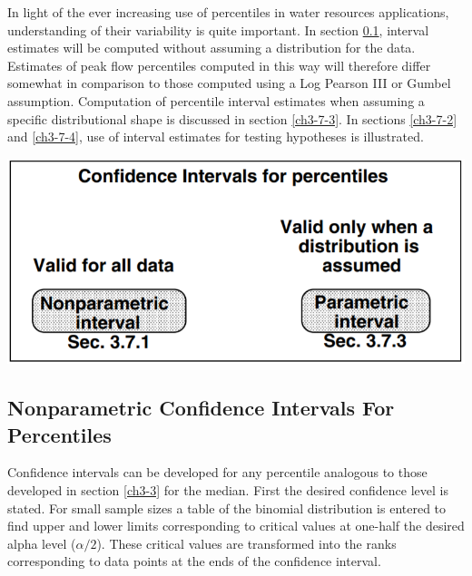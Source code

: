 \documentclass[]{book}
\begin{document}
In light of the ever increasing use of percentiles in water resources applications, understanding of their variability is quite important. In section \ref{ch3-7-1}, interval estimates will be computed without assuming a distribution for the data. Estimates of peak flow percentiles computed in this way will therefore differ somewhat in comparison to those computed using a Log Pearson III or Gumbel assumption. Computation of percentile interval estimates when assuming a specific distributional shape is discussed in section \ref{ch3-7-3}. In sections \ref{ch3-7-2} and \ref{ch3-7-4}, use of interval estimates for testing hypotheses is illustrated.

\begin{center}\includegraphics[width=10.85in]{figures/3_D} \end{center}

\hypertarget{ch3-7-1}{%
\subsection{Nonparametric Confidence Intervals For Percentiles}\label{ch3-7-1}}

Confidence intervals can be developed for any percentile analogous to those developed in section \ref{ch3-3} for the median. First the desired confidence level is stated. For small sample sizes a table of the binomial distribution is entered to find upper and lower limits corresponding to critical values at one-half the desired alpha level (\(\alpha / 2\)). These critical values are transformed into the ranks corresponding to data points at the ends of the confidence interval.
\end{document}
